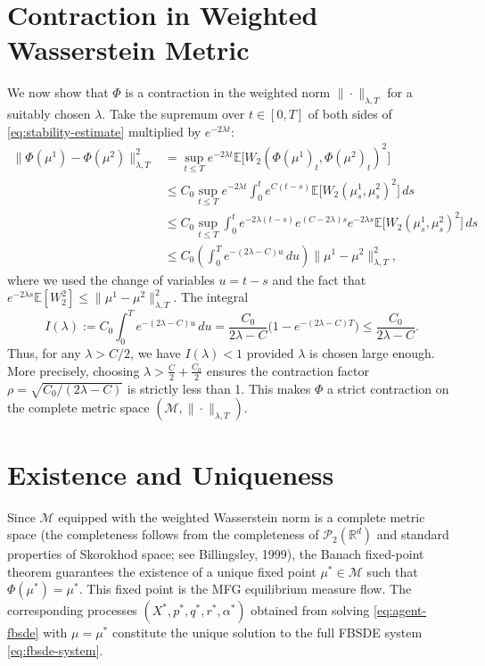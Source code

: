 \section{Contraction in Weighted Wasserstein Metric}
\label{sec:wp-contraction}

We now show that $\Phi$ is a contraction in the weighted norm $\|\cdot\|_{\lambda,T}$
for a suitably chosen $\lambda$. Take the supremum over $t \in [0,T]$ of both sides of
\eqref{eq:stability-estimate} multiplied by $e^{-2\lambda t}$:
\begin{align*}
    \|\Phi(\mu^1) - \Phi(\mu^2)\|_{\lambda,T}^2 &= \sup_{t \leq T} e^{-2\lambda t}
        \mathbb{E}\big[W_2(\Phi(\mu^1)_t, \Phi(\mu^2)_t)^2\big] \\
    &\leq C_0 \sup_{t \leq T} e^{-2\lambda t} \int_0^t e^{C(t-s)}
        \mathbb{E}\big[W_2(\mu_s^1, \mu_s^2)^2\big]\, ds \\
    &\leq C_0 \sup_{t \leq T} \int_0^t e^{-2\lambda(t-s)} e^{(C-2\lambda)s} e^{-2\lambda
        s} \mathbb{E}\big[W_2(\mu_s^1, \mu_s^2)^2\big]\, ds \\
    &\leq C_0 \left( \int_0^T e^{-(2\lambda - C)u}\, du \right)
        \|\mu^1 - \mu^2\|_{\lambda,T}^2,
\end{align*}
where we used the change of variables $u = t-s$ and the fact that
$e^{-2\lambda s} \mathbb{E}[W_2^2] \leq \|\mu^1 - \mu^2\|_{\lambda,T}^2$. The integral
\[
    I(\lambda) := C_0 \int_0^T e^{-(2\lambda - C)u}\, du = \frac{C_0}{2\lambda - C}
    \big(1 - e^{-(2\lambda-C)T}\big) \leq \frac{C_0}{2\lambda - C}.
\]
Thus, for any $\lambda > C/2$, we have $I(\lambda) < 1$ provided $\lambda$ is chosen
large enough. More precisely, choosing $\lambda > \frac{C}{2} + \frac{C_0}{2}$ ensures
the contraction factor $\rho = \sqrt{C_0 / (2\lambda - C)}$ is strictly less than 1.
This makes $\Phi$ a strict contraction on the complete metric space
$(\mathcal{M}, \|\cdot\|_{\lambda,T})$.


\section{Existence and Uniqueness}
\label{sec:wp-existence}

Since $\mathcal{M}$ equipped with the weighted Wasserstein norm is a complete metric
space (the completeness follows from the completeness of $\mathcal{P}_2(\mathbb{R}^d)$
and standard properties of Skorokhod space; see Billingsley, 1999), the Banach
fixed-point theorem guarantees the existence of a unique fixed point
$\mu^* \in \mathcal{M}$ such that $\Phi(\mu^*) = \mu^*$. This fixed point is the MFG
equilibrium measure flow. The corresponding processes $(X^*, p^*, q^*, r^*, \alpha^*)$
obtained from solving \eqref{eq:agent-fbsde} with $\mu = \mu^*$ constitute the unique
solution to the full FBSDE system \eqref{eq:fbsde-system}.

